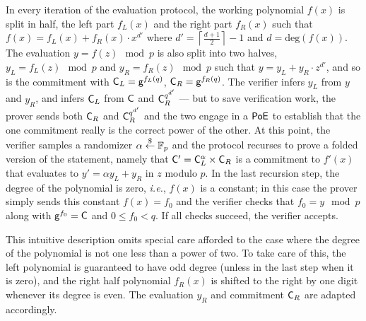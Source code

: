 \documentclass{article}
\theoremstyle{definition}
\begin{document}
In every iteration of the evaluation protocol, the working polynomial $f(x)$ is split in half, the left part $f_L(x)$ and the right part $f_R(x)$ such that $f(x) = f_L(x) + f_R(x) \cdot x^{d'}$ where $d' = \left\lceil \frac{d+1}{2}\right\rceil - 1$ and $d = \mathrm{deg}(f(x))$. The evaluation $y = f(z) \mod p$ is also split into two halves, $y_L = f_L(z) \mod p$ and $y_R = f_R(z) \mod p$ such that $y = y_L + y_R \cdot z^{d'}$, and so is the commitment with $\mathsf{C}_L = \mathsf{g}^{f_L(q)}$, $\mathsf{C}_R = \mathsf{g}^{f_R(q)}$. The verifier infers $y_L$ from $y$ and $y_R$, and infers $\mathsf{C}_L$ from $\mathsf{C}$ and $\mathsf{C}_R^{q^{d'}}$ --- but to save verification work, the prover sends both $\mathsf{C}_R$ and $\mathsf{C}_R^{q^{d'}}$ and the two engage in a $\textsf{{PoE}}$ to establish that the one commitment really is the correct power of the other. At this point, the verifier samples a randomizer $\alpha \overset{\$}{\gets} \mathbb{F}_p$ and the protocol recurses to prove a folded version of the statement, namely that $\mathsf{C}' = \mathsf{C}_L^\alpha \times \mathsf{C}_R$ is a commitment to $f'(x)$ that evaluates to $y' = \alpha y_L + y_R$ in $z$ modulo $p$. In the last recursion step, the degree of the polynomial is zero, \emph{i.e.}, $f(x)$ is a constant; in this case the prover simply sends this constant $f(x) = f_0$ and the verifier checks that $f_0 = y \mod p$ along with $\mathsf{g}^{f_0} = \mathsf{C}$ and $0 \leq f_0 < q$. If all checks succeed, the verifier accepts.

This intuitive description omits special care afforded to the case where the degree of the polynomial is not one less than a power of two. To take care of this, the left polynomial is guaranteed to have odd degree (unless in the last step when it is zero), and the right half polynomial $f_R(x)$ is shifted to the right by one digit whenever its degree is even. The evaluation $y_R$ and commitment $\mathsf{C}_R$ are adapted accordingly.
\end{document}

